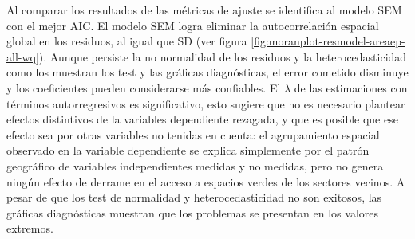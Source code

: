 \documentclass[12pt,]{book}
\begin{document}
Al comparar los resultados de las métricas de ajuste se identifica al
modelo SEM con el mejor AIC. El modelo SEM logra eliminar la
autocorrelación espacial global en los residuos, al igual que SD (ver
figura \ref{fig:moranplot-resmodel-areaep-all-wq}). Aunque persiste la
no normalidad de los residuos y la heterocedasticidad como los muestran
los test y las gráficas diagnósticas, el error cometido disminuye y los
coeficientes pueden considerarse más confiables. El \(\lambda\) de las
estimaciones con términos autorregresivos es significativo, esto sugiere
que no es necesario plantear efectos distintivos de la variables
dependiente rezagada, y que es posible que ese efecto sea por otras
variables no tenidas en cuenta: el agrupamiento espacial observado en la
variable dependiente se explica simplemente por el patrón geográfico de
variables independientes medidas y no medidas, pero no genera ningún
efecto de derrame en el acceso a espacios verdes de los sectores
vecinos. A pesar de que los test de normalidad y heterocedasticidad no
son exitosos, las gráficas diagnósticas muestran que los problemas se
presentan en los valores extremos.
\end{document}
